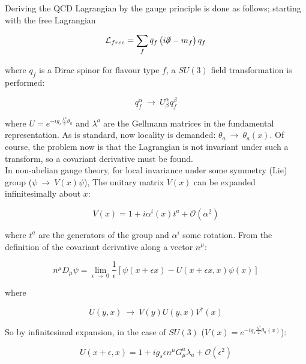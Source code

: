 \documentclass[11pt,a4paper]{article}
\begin{document}
Deriving the QCD Lagrangian by the gauge principle is done as follows; starting with the free Lagrangian

\begin{equation}
	\mathcal{L}_{free} = \sum_f \bar{q}_f\left(i\slashed \partial - m_f\right)q_f
\end{equation}

where $q_f$ is a Dirac spinor for flavour type $f$, a $SU(3)$ field transformation is performed:

\begin{equation}
	q_f^\alpha \:\rightarrow\: U^\alpha_\beta q_f^\beta
\end{equation} 

where $U = e^{-ig_s\frac{\lambda^a}{2}\theta_a}$ and $\lambda^a$ are the Gellmann matrices in the fundamental representation. As is standard, now locality is demanded: $\theta_a \:\rightarrow\: \theta_a(x)$. Of course, the problem now is that the Lagrangian is not invariant under such a transform, so a covariant derivative must be found.\\
In non-abelian gauge theory, for local invariance under some symmetry (Lie) group ($\psi \:\rightarrow\: V(x)\psi$), The unitary matrix $V(x)$ can be expanded infinitesimally about $x$:

\begin{equation}
	V(x) = 1 + i\alpha^i(x)t^a + \mathcal{O}(\alpha^2)
\end{equation}

where $t^a$ are the generators of the group and $\alpha^i$ some rotation. From the definition of the covariant derivative along a vector $n^\mu$:

\begin{equation}
	n^\mu D_\mu\psi = \lim_{\epsilon\:\rightarrow\:0} \frac{1}{\epsilon}\left[\psi(x+\epsilon x) - U(x+\epsilon x,x)\psi(x)\right]
	\label{Def_of_D}
\end{equation}

where

\begin{equation}
	U(y,x) \:\rightarrow\: V(y)U(y,x)V^\dagger(x)
\end{equation}

So by infinitesimal expansion, in the case of $SU(3)$ ($V(x) = e^{-ig_s\frac{\lambda^a}{2}\theta_a(x)}$):

\begin{equation}
	U(x+\epsilon, x) = 1 + ig_s\epsilon n^\mu G_\mu^a \lambda_a + \mathcal{O}(\epsilon^2)
\end{equation}
\end{document}
